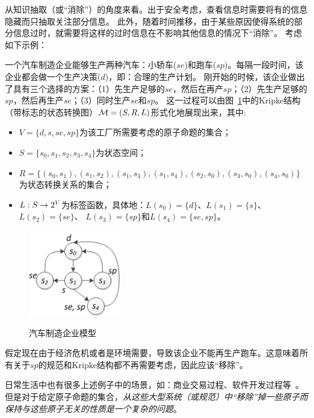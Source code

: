 从知识抽取（或“消除”）的角度来看。出于安全考虑，查看信息时需要将有的信息隐藏而只抽取关注部分信息。
此外，随着时间推移，由于某些原因使得系统的部分信息过时，就需要将这样的过时信息在不影响其他信息的情况下“消除”。
考虑如下示例：
\begin{example}[汽车制造企业模型]\label{car_manufacturing}
	一个汽车制造企业能够生产两种汽车：小轿车($se$)和跑车($sp$)。每隔一段时间，该企业都会做一个生产决策($d$)，即：合理的生产计划。
	刚开始的时候，该企业做出了具有三个选择的方案：（1）先生产足够的$se$，然后在再产$sp$；（2）先生产足够的$sp$，然后再生产$se$；（3）同时生产$se$和$sp$。
	这一过程可以由图~\ref{BVM}中的Kripke结构（带标志的状态转换图）${\cal M}=(S,R,L)$形式化地展现出来，其中:
	\begin{itemize}
		\item $V=\{d,s, se, sp\}$为该工厂所需要考虑的原子命题的集合；
		\item $S=\{s_0,s_1,s_2,s_3,s_4\}$为状态空间；
		\item $R = \{(s_0, s_1), (s_1,s_2), (s_1,s_3), (s_1,s_4), (s_2,s_0), (s_3,s_0),(s_4,s_0)\}$为状态转换关系的集合；
		\item $L: S \rightarrow 2^V$为标签函数，具体地：$L(s_0) = \{d\}$、$L(s_1) = \{s\}$、 $L(s_2)=\{se\}$、 $L(s_3) = \{sp\}$和$L(s_4) = \{se,sp\}$。
	\end{itemize}
	\begin{figure}[ht]
		\centering
		\includegraphics[width=4cm]{NnewCar.png}\\
		\caption{汽车制造企业模型}\label{BVM}
	\end{figure}

假定现在由于经济危机或者是环境需要，导致该企业不能再生产跑车。这意味着所有关于$sp$的规范和Kripke结构都不再需要考虑，因此应该“移除”。
\end{example}

日常生活中也有很多上述例子中的场景，如：商业交易过程、软件开发过程等~\cite{Baier:PMC:2008}。
但是对于给定原子命题的集合，\emph{从这些大型系统（或规范）中“移除”掉一些原子而保持与这些原子无关的性质是一个复杂的问题}。

